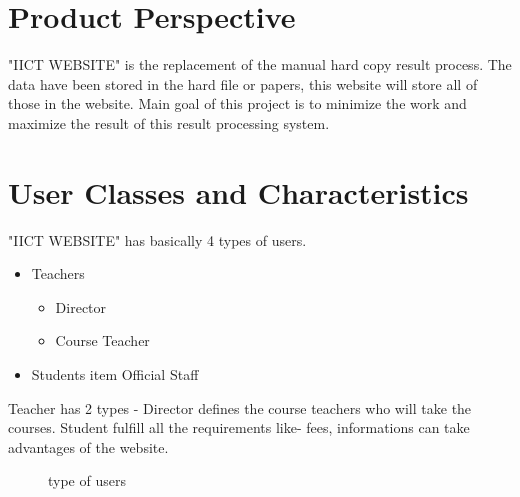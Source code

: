\documentclass{scrreprt}
\begin{document}
    \section{Product Perspective}
    "IICT WEBSITE" is the replacement of the manual hard copy result process. The data have been stored in the hard file or papers, this website will store all of those in the website. Main goal of this project is to minimize the work and maximize the result of this result processing system.
    
    \section{User Classes and Characteristics}
    "IICT WEBSITE" has basically 4 types of users. 
    \begin{itemize}
      \item Teachers
        \begin{itemize}
            \item Director
            \item Course Teacher
        \end{itemize}
      \item Students
      item Official Staff
    \end{itemize}
    Teacher has 2 types - Director defines the course teachers who will take the courses. Student fulfill all the requirements like- fees, informations can take advantages of the website. 
    \begin{figure}
        \centering 
        \caption{type of users}
        \label{fig:type of users}
    \end{figure}
\end{document}
